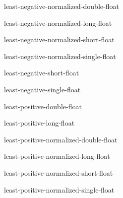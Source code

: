 \documentclass[10pt,english]{book}
\begin{document}
\begin{constant}{least-negative-normalized-double-float}{}
  
\end{constant}

\begin{constant}{least-negative-normalized-long-float}{}
  
\end{constant}

\begin{constant}{least-negative-normalized-short-float}{}
  
\end{constant}

\begin{constant}{least-negative-normalized-single-float}{}
  
\end{constant}

\begin{constant}{least-negative-short-float}{}
  
\end{constant}

\begin{constant}{least-negative-single-float}{}
  
\end{constant}

\begin{constant}{least-positive-double-float}{}
  
\end{constant}

\begin{constant}{least-positive-long-float}{}
  
\end{constant}

\begin{constant}{least-positive-normalized-double-float}{}
  
\end{constant}

\begin{constant}{least-positive-normalized-long-float}{}
  
\end{constant}

\begin{constant}{least-positive-normalized-short-float}{}
  
\end{constant}

\begin{constant}{least-positive-normalized-single-float}{}
  
\end{constant}
\end{document}
